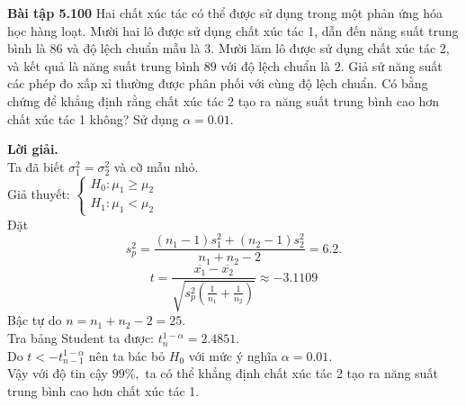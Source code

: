 \begin{mybox}
\textbf{Bài tập 5.100} Hai chất xúc tác có thể được sử dụng trong một phản ứng hóa học hàng loạt. Mười hai lô được sử dụng chất xúc tác 1, dẫn đến năng suất trung bình là $86$ và độ lệch chuẩn mẫu là $3.$ Mười lăm lô được sử dụng chất xúc tác 2, và kết quả là năng suất trung bình $89$ với độ lệch chuẩn là $2.$ Giả sử năng suất các phép đo xấp xỉ thường được phân phối với cùng độ lệch chuẩn. Có bằng chứng để khẳng định rằng chất xúc tác 2 tạo ra năng suất trung bình cao hơn chất xúc tác 1 không? Sử dụng $\alpha = 0.01.$
\end{mybox}
\textbf{Lời giải.}\\
Ta đã biết $\sigma_1^2 = \sigma_2^2 $ và cỡ mẫu nhỏ.\\
Giả thuyết: $\begin{cases}
H_0: \mu_1 \geqslant \mu_2\\
H_1: \mu_1 < \mu_2
\end{cases}$\\
Đặt $$s_p^2 = \frac{{\left( {{n_1} - 1} \right)s_1^2 + \left( {{n_2} - 1} \right)s_2^2}}{{{n_1} + {n_2} - 2}} = 6.2.$$
$$t = \frac{{\overline {{x_1}}  - \overline {{x_2}} }}{{\sqrt {s_p^2\left( {\frac{1}{{{n_1}}} + \frac{1}{{{n_2}}}} \right)} }} \approx -3.1109$$
Bậc tự do $n = n_1 + n_2 - 2 = 25.$\\
Tra bảng Student ta được: $t_{n}^{1 - \alpha} = 2.4851.$\\
Do $ t  < -t_{n - 1}^{1 - \alpha}$ nên ta bác bỏ $H_0$ với mức ý nghĩa $\alpha = 0.01.$\\
Vậy với độ tin cậy $99\%,$ ta có thể khẳng định chất xúc tác 2 tạo ra năng suất trung bình cao hơn chất xúc tác 1.

